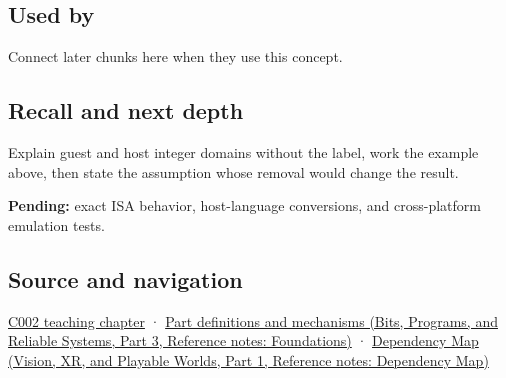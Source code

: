 \subsection{Used by}\label{appendix-33e7a011b684-used-by}

\hypertarget{appendix-33e7a011b684-used-by}{}

Connect later chunks here when they use this concept.

\subsection{Recall and next depth}\label{appendix-33e7a011b684-recall-and-next-depth}

\hypertarget{appendix-33e7a011b684-recall-and-next-depth}{}

Explain guest and host integer domains without the label, work the example above, then state the assumption whose removal would change the result.

\textbf{Pending:} exact ISA behavior, host-language conversions, and cross-platform emulation tests.

\subsection{Source and navigation}\label{appendix-33e7a011b684-source-and-navigation}

\hypertarget{appendix-33e7a011b684-source-and-navigation}{}

\hyperref[01-foundations-i-ch001-arithmetic-becomes-a-policy]{C002 teaching chapter} · \href{../01-Bits-Programs-and-Reliable-Systems-P03/main.pdf\#appendix-fd090d982a15}{Part definitions and mechanisms (Bits, Programs, and Reliable Systems, Part 3, Reference notes: Foundations)} · \href{../07-Vision-XR-and-Playable-Worlds-P01/main.pdf\#appendix-4ad47bdd269a}{Dependency Map (Vision, XR, and Playable Worlds, Part 1, Reference notes: Dependency Map)}
